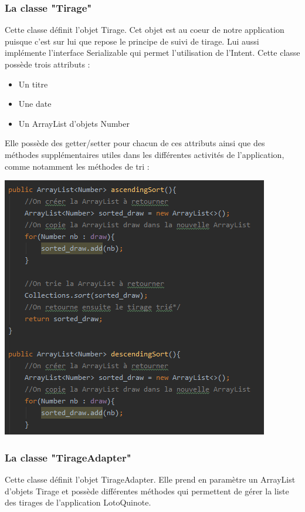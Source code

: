 \documentclass{article}
\begin{document}
\subsubsection{La classe "Tirage"}
Cette classe définit l'objet Tirage. Cet objet est au coeur de notre application puisque c'est sur lui que repose le principe de suivi de tirage. Lui aussi implémente l'interface Serializable qui permet l'utilisation de l'Intent.
\newline Cette classe possède trois attributs :
\begin{itemize}
    \item Un titre
    \item Une date
    \item Un ArrayList d'objets Number
\end{itemize}
Elle possède des getter/setter pour chacun de ces attributs ainsi que des méthodes supplémentaires utiles dans les différentes activités de l'application, comme notamment les méthodes de tri :
\vspace{1em}
\newline
\begin{center}\includegraphics[]{tri_Tirage.png}\end{center}

\subsubsection{La classe "TirageAdapter"}
Cette classe définit l'objet TirageAdapter. Elle prend en paramètre un ArrayList d'objets Tirage et possède différentes méthodes qui permettent de gérer la liste des tirages de l'application LotoQuinote.
\end{document}
